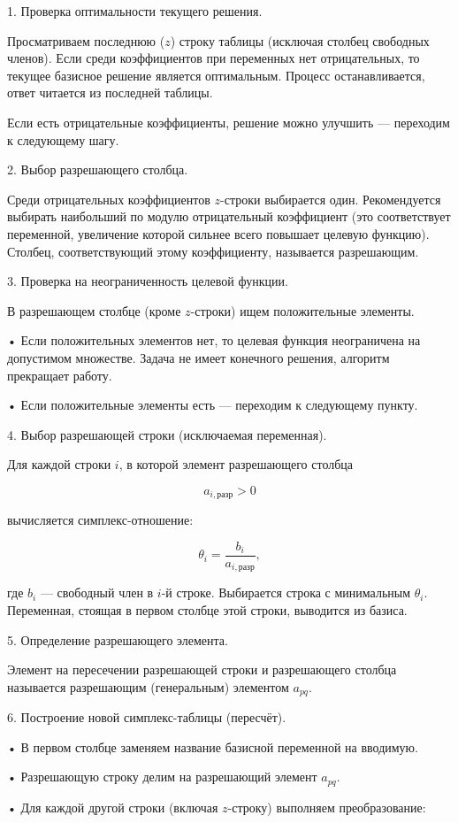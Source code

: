\documentclass[a4paper,14pt]{extarticle}
\begin{document}
1. Проверка оптимальности текущего решения.

Просматриваем последнюю ($z$) строку таблицы (исключая столбец свободных членов). Если среди коэффициентов при переменных нет отрицательных, то текущее базисное решение является оптимальным. Процесс останавливается, ответ читается из последней таблицы.

Если есть отрицательные коэффициенты, решение можно улучшить — переходим к следующему шагу.

2. Выбор разрешающего столбца.

Среди отрицательных коэффициентов $z$-строки выбирается один. Рекомендуется выбирать наибольший по модулю отрицательный коэффициент (это соответствует переменной, увеличение которой сильнее всего повышает целевую функцию). Столбец, соответствующий этому коэффициенту, называется разрешающим.

3. Проверка на неограниченность целевой функции.

В разрешающем столбце (кроме $z$-строки) ищем положительные элементы.

• Если положительных элементов нет, то целевая функция неограничена на допустимом множестве. Задача не имеет конечного решения, алгоритм прекращает работу.

• Если положительные элементы есть — переходим к следующему пункту.

4. Выбор разрешающей строки (исключаемая переменная).

Для каждой строки $i$, в которой элемент разрешающего столбца

\[
a_{i,\text{разр}}>0
\]

вычисляется симплекс-отношение:

\[
\theta_i=\frac{b_i}{a_{i,\text{разр}}},
\]

где $b_i$ — свободный член в $i$-й строке. Выбирается строка с минимальным $\theta_i$. Переменная, стоящая в первом столбце этой строки, выводится из базиса.

5. Определение разрешающего элемента.

Элемент на пересечении разрешающей строки и разрешающего столбца называется разрешающим (генеральным) элементом $a_{pq}$.

6. Построение новой симплекс-таблицы (пересчёт).

• В первом столбце заменяем название базисной переменной на вводимую.

• Разрешающую строку делим на разрешающий элемент $a_{pq}$.

• Для каждой другой строки (включая $z$-строку) выполняем преобразование:
\end{document}
